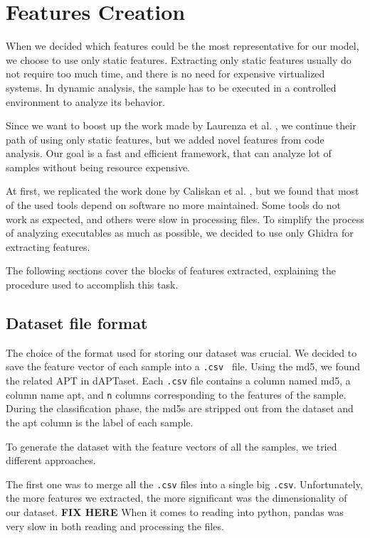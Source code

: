 \chapter{Features Creation}
\label{ch:feat-cre}

When we decided which features could be the most representative for our model, we choose to use only static features. Extracting only static features usually do not require too much time, and there is no need for expensive virtualized systems. In dynamic analysis, the sample has to be executed in a controlled environment to analyze its behavior. 

Since we want to boost up the work made by Laurenza et al. \cite{laurenza2017malware}, we continue their path of using only static features, but we added novel features from code analysis.  Our goal is a fast and efficient framework, that can analyze lot of samples without being resource expensive.

At first, we replicated the work done by Caliskan et al. \cite{caliskan2015anonymizing}, but we found that most of the used tools depend on software no more maintained. Some tools do not work as expected, and others were slow in processing files. To simplify the process of analyzing executables as much as possible, we decided to use only Ghidra for extracting features.

The following sections cover the blocks of features extracted, explaining the procedure used to accomplish this task.

\section{Dataset file format}
The choice of the format used for storing our dataset was crucial.
We decided to save the feature vector of each sample into a \texttt{.csv } file. Using the md5, we found the related APT in dAPTaset. Each \texttt{.csv} file contains a column named md5, a column name apt, and \texttt{n} columns corresponding to the features of the sample. During the classification phase, the md5s are stripped out from the dataset and the apt column is the label of each sample.

To generate the dataset with the feature vectors of all the samples, we tried different approaches. 

The first one was to merge all the \texttt{.csv} files into a single big \texttt{.csv}. Unfortunately, the more features we extracted, the more significant was the dimensionality of our dataset. \textbf{FIX HERE}  When it comes to reading into python, pandas was very slow in both reading and processing the files.

